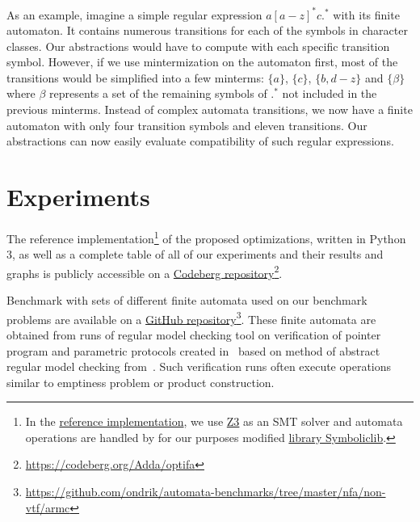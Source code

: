 As an example, imagine a simple regular expression $a[a-z]^*c.^*$ with its finite automaton. It contains numerous transitions for each of the symbols in character classes. Our abstractions would have to compute with each specific transition symbol. However, if we use mintermization on the automaton first, most of the transitions would be simplified into a few minterms: $\{ a \}$, $\{ c \}$, $\{ b, d-z \}$ and $\{ \beta \}$ where $\beta$ represents a set of the remaining symbols of $.^*$ not included in the previous minterms. Instead of complex automata transitions, we now have a finite automaton with only four transition symbols and eleven transitions. Our abstractions can now easily evaluate compatibility of such regular expressions.

\chapter{Experiments}\label{experimentsAndResultsChapter}

The reference implementation\footnote{In the \href{https://codeberg.org/Adda/optifa}{reference implementation}, we use \href{https://github.com/Z3Prover/z3}{Z3} as an SMT solver and automata operations are handled by for our purposes modified \href{https://codeberg.org/Adda/symboliclib}{library Symboliclib}.} of the proposed optimizations, written in Python 3, as well as a complete table of all of our experiments and their results and graphs is publicly accessible on a \href{https://codeberg.org/Adda/optifa}{Codeberg repository}\footnote{\url{https://codeberg.org/Adda/optifa}}.

Benchmark with sets of different finite automata used on our benchmark problems are available on a \href{https://github.com/ondrik/automata-benchmarks/tree/master/nfa/non-vtf/armc}{GitHub repository}\footnote{\url{https://github.com/ondrik/automata-benchmarks/tree/master/nfa/non-vtf/armc}}. These finite automata are obtained from runs of regular model checking tool on verification of pointer program and parametric protocols created in~\cite{model_checking_tool_10.1007/978-3-540-70844-5_7} based on method of abstract regular model checking from~\cite{method_model_checking_tool}. Such verification runs often execute operations similar to emptiness problem or product construction.

